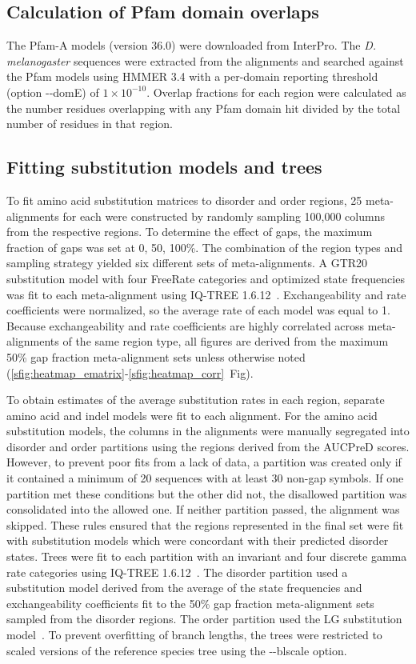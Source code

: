 \subsection{Calculation of Pfam domain overlaps}
The Pfam-A models (version 36.0) were downloaded from InterPro. The \textit{D. melanogaster} sequences were extracted from the alignments and searched against the Pfam models using HMMER 3.4 with a per-domain reporting threshold (option -{}-domE) of $1 \times 10^{-10}$. Overlap fractions for each region were calculated as the number residues overlapping with any Pfam domain hit divided by the total number of residues in that region.

\subsection{Fitting substitution models and trees}
To fit amino acid substitution matrices to disorder and order regions, 25 meta-alignments for each were constructed by randomly sampling 100,000 columns from the respective regions. To determine the effect of gaps, the maximum fraction of gaps was set at 0, 50, 100\%. The combination of the region types and sampling strategy yielded six different sets of meta-alignments. A GTR20 substitution model with four FreeRate categories and optimized state frequencies was fit to each meta-alignment using IQ-TREE 1.6.12~\cite{Nguyen2014}. Exchangeability and rate coefficients were normalized, so the average rate of each model was equal to 1. Because exchangeability and rate coefficients are highly correlated across meta-alignments of the same region type, all figures are derived from the maximum 50\% gap fraction meta-alignment sets unless otherwise noted (\ref{sfig:heatmap_ematrix}-\ref{sfig:heatmap_corr}~Fig).

To obtain estimates of the average substitution rates in each region, separate amino acid and indel models were fit to each alignment. For the amino acid substitution models, the columns in the alignments were manually segregated into disorder and order partitions using the regions derived from the AUCPreD scores. However, to prevent poor fits from a lack of data, a partition was created only if it contained a minimum of 20 sequences with at least 30 non-gap symbols. If one partition met these conditions but the other did not, the disallowed partition was consolidated into the allowed one. If neither partition passed, the alignment was skipped. These rules ensured that the regions represented in the final set were fit with substitution models which were concordant with their predicted disorder states. Trees were fit to each partition with an invariant and four discrete gamma rate categories using IQ-TREE 1.6.12~\cite{Yang1994}. The disorder partition used a substitution model derived from the average of the state frequencies and exchangeability coefficients fit to the 50\% gap fraction meta-alignment sets sampled from the disorder regions. The order partition used the LG substitution model~\cite{Le2008}. To prevent overfitting of branch lengths, the trees were restricted to scaled versions of the reference species tree using the -{}-blscale option.


